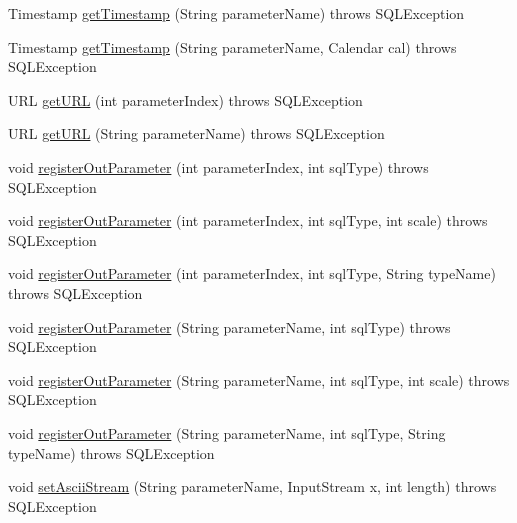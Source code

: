 \begin{DoxyCompactItemize}
\item 
Timestamp \mbox{\hyperlink{classcom_1_1mysql_1_1jdbc_1_1_callable_statement_ac7c3faa6bd8c91104870d6ae4dc25916}{get\+Timestamp}} (String parameter\+Name)  throws S\+Q\+L\+Exception 
\item 
Timestamp \mbox{\hyperlink{classcom_1_1mysql_1_1jdbc_1_1_callable_statement_a85044e257c65d9ce314d9cdbee27a853}{get\+Timestamp}} (String parameter\+Name, Calendar cal)  throws S\+Q\+L\+Exception 
\item 
U\+RL \mbox{\hyperlink{classcom_1_1mysql_1_1jdbc_1_1_callable_statement_a945b80e68af80612f673fe4c483caad4}{get\+U\+RL}} (int parameter\+Index)  throws S\+Q\+L\+Exception 
\item 
U\+RL \mbox{\hyperlink{classcom_1_1mysql_1_1jdbc_1_1_callable_statement_acd2ed833e20cc8a73e5723bde7bfb394}{get\+U\+RL}} (String parameter\+Name)  throws S\+Q\+L\+Exception 
\item 
void \mbox{\hyperlink{classcom_1_1mysql_1_1jdbc_1_1_callable_statement_a5158af0506cf90040062b2049550f59b}{register\+Out\+Parameter}} (int parameter\+Index, int sql\+Type)  throws S\+Q\+L\+Exception 
\item 
void \mbox{\hyperlink{classcom_1_1mysql_1_1jdbc_1_1_callable_statement_aee8ffa31c60e761946b76031493a3682}{register\+Out\+Parameter}} (int parameter\+Index, int sql\+Type, int scale)  throws S\+Q\+L\+Exception 
\item 
void \mbox{\hyperlink{classcom_1_1mysql_1_1jdbc_1_1_callable_statement_a0f7620f0e4d1315e1a3ed826860039de}{register\+Out\+Parameter}} (int parameter\+Index, int sql\+Type, String type\+Name)  throws S\+Q\+L\+Exception 
\item 
void \mbox{\hyperlink{classcom_1_1mysql_1_1jdbc_1_1_callable_statement_a89d67ced2bd6cc64c13f0eb502d9991c}{register\+Out\+Parameter}} (String parameter\+Name, int sql\+Type)  throws S\+Q\+L\+Exception 
\item 
void \mbox{\hyperlink{classcom_1_1mysql_1_1jdbc_1_1_callable_statement_aac8fb04a2335f34f237458370e44eb19}{register\+Out\+Parameter}} (String parameter\+Name, int sql\+Type, int scale)  throws S\+Q\+L\+Exception 
\item 
void \mbox{\hyperlink{classcom_1_1mysql_1_1jdbc_1_1_callable_statement_a8b1ce8c9788c3c3cdcd60db1aeebe961}{register\+Out\+Parameter}} (String parameter\+Name, int sql\+Type, String type\+Name)  throws S\+Q\+L\+Exception 
\item 
void \mbox{\hyperlink{classcom_1_1mysql_1_1jdbc_1_1_callable_statement_a02cd11a7e7dee124ce3db9f58a946e84}{set\+Ascii\+Stream}} (String parameter\+Name, Input\+Stream x, int length)  throws S\+Q\+L\+Exception 

\end{DoxyCompactItemize}
